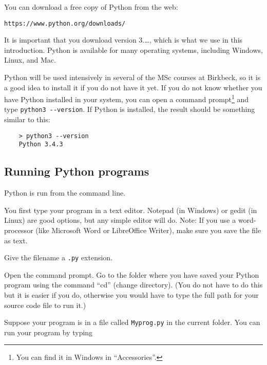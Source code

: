  
You can download a free copy of Python 
from the web:

\begin{verbatim}
https://www.python.org/downloads/
\end{verbatim}

It is important that you download version 3.\ldots, which is what we
use in this introduction.
Python is available for many
operating systems, including Windows, Linux, and Mac.%


Python will be used intensively in several of the MSc courses 
at Birkbeck, so it is a good idea to install it if you do not have it
yet.
If you do not know whether you have Python installed in your
system, you can open a command prompt\footnote{You can find it in Windows in
  ``Accessories''.} and type
\verb+python3 --version+.
If Python is installed, the result should be something similar to this:

\begin{verbatim}
    > python3 --version
    Python 3.4.3
\end{verbatim}



\subsection*{Running Python programs}

Python is run from the command line.

You first type your program in a text editor. Notepad (in Windows) or
gedit (in Linux) are good options, but any simple editor will
do. Note: If you use a word-processor (like Microsoft Word or
LibreOffice Writer), make sure you save the file as text.

Give the filename a \texttt{.py} extension.

Open the command prompt. 
Go to the folder where you have saved your Python
program using the command ``cd'' (change directory). (You do not have to
do this but it is easier if you do, otherwise you would have to type the full
path for your source code file to run it.)

Suppose your program is in a file called
\texttt{Myprog.py} in the current folder.
You can run your program by typing

